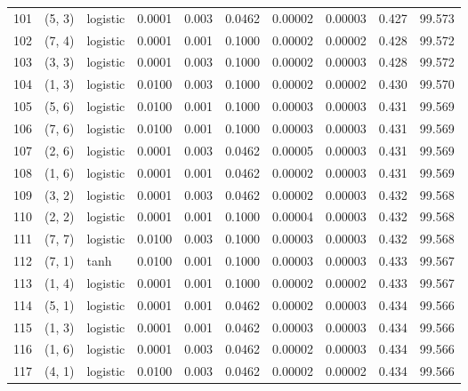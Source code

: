 \begin{tabular}{lllrrrrrrr}
101 &      (5, 3) &  logistic &  0.0001 &  0.003 &  0.0462 &          0.00002 &    0.00003 &       0.427 &    99.573 \\
102 &      (7, 4) &  logistic &  0.0001 &  0.001 &  0.1000 &          0.00002 &    0.00002 &       0.428 &    99.572 \\
103 &      (3, 3) &  logistic &  0.0001 &  0.003 &  0.1000 &          0.00002 &    0.00003 &       0.428 &    99.572 \\
104 &      (1, 3) &  logistic &  0.0100 &  0.003 &  0.1000 &          0.00002 &    0.00002 &       0.430 &    99.570 \\
105 &      (5, 6) &  logistic &  0.0100 &  0.001 &  0.1000 &          0.00003 &    0.00003 &       0.431 &    99.569 \\
106 &      (7, 6) &  logistic &  0.0100 &  0.001 &  0.1000 &          0.00003 &    0.00003 &       0.431 &    99.569 \\
107 &      (2, 6) &  logistic &  0.0001 &  0.003 &  0.0462 &          0.00005 &    0.00003 &       0.431 &    99.569 \\
108 &      (1, 6) &  logistic &  0.0001 &  0.001 &  0.0462 &          0.00002 &    0.00003 &       0.431 &    99.569 \\
109 &      (3, 2) &  logistic &  0.0001 &  0.003 &  0.0462 &          0.00002 &    0.00003 &       0.432 &    99.568 \\
110 &      (2, 2) &  logistic &  0.0001 &  0.001 &  0.1000 &          0.00004 &    0.00003 &       0.432 &    99.568 \\
111 &      (7, 7) &  logistic &  0.0100 &  0.003 &  0.1000 &          0.00003 &    0.00003 &       0.432 &    99.568 \\
112 &      (7, 1) &      tanh &  0.0100 &  0.001 &  0.1000 &          0.00003 &    0.00003 &       0.433 &    99.567 \\
113 &      (1, 4) &  logistic &  0.0001 &  0.001 &  0.1000 &          0.00002 &    0.00002 &       0.433 &    99.567 \\
114 &      (5, 1) &  logistic &  0.0001 &  0.001 &  0.0462 &          0.00002 &    0.00003 &       0.434 &    99.566 \\
115 &      (1, 3) &  logistic &  0.0001 &  0.001 &  0.0462 &          0.00003 &    0.00003 &       0.434 &    99.566 \\
116 &      (1, 6) &  logistic &  0.0001 &  0.003 &  0.0462 &          0.00002 &    0.00003 &       0.434 &    99.566 \\
117 &      (4, 1) &  logistic &  0.0100 &  0.003 &  0.0462 &          0.00002 &    0.00002 &       0.434 &    99.566 \\

\end{tabular}
